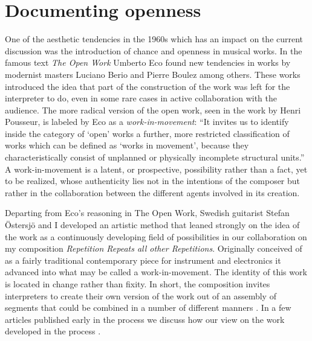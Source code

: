\documentclass[11pt,a4paper]{article}
\begin{document}


\section*{Documenting openness}
\label{sec:open-work-repetition}
One of the aesthetic tendencies in the 1960s which has an impact on the current discussion was the introduction of chance and openness in musical works. In the famous text \emph{The Open Work} Umberto Eco \citep{eco68} found new tendencies in works by modernist masters Luciano Berio and Pierre Boulez among others. These works introduced the idea that part of the construction of the work was left for the interpreter to do, even in some rare cases in active collaboration with the audience. The more radical version of the open work, seen in the work by Henri Pousseur, is labeled by Eco as a \emph{work-in-movement}: ``It invites us to identify inside the category of `open' works a further, more restricted classification of works which can be defined as `works in movement', because they characteristically consist of unplanned or physically incomplete structural units.'' \citep[p. 22]{eco68} A work-in-movement is a latent, or prospective, possibility rather than a fact, yet to be realized, whose authenticity lies not in the intentions of the composer but rather in the collaboration between the different agents involved in its creation.\citep{eco68,frisk08phd} %

Departing from Eco's reasoning in The Open Work, Swedish guitarist Stefan Östersjö and I developed an artistic method that leaned strongly on the idea of the work as a continuously developing field of possibilities in our collaboration on my composition \emph{Repetition Repeats all other Repetitions}. Originally conceived of as a fairly traditional contemporary piece for instrument and electronics it advanced into what may be called a work-in-movement. The identity of this work is located in change rather than fixity. In short, the composition invites interpreters to create their own version of the work out of an assembly of segments that could be combined in a number of different manners \citep{friskcoessens2013}. In a few articles published early in the process we discuss how our view on the work developed in the process \citep{frisk-ost06,frisk-ost06-2}.
\end{document}

